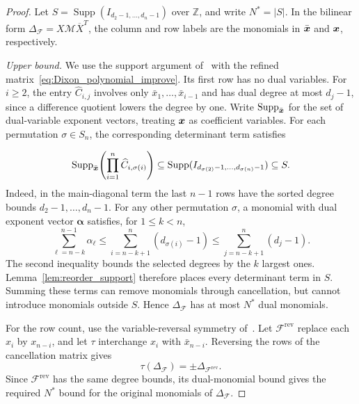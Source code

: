 \begin{proof}
Let $S=\operatorname{Supp}(I_{d_2-1,\ldots,d_n-1})$ over $\mathbb Z$, and write $N^*=|S|$. In the bilinear form $\Delta_{\mathcal F}=X\mathcal M\overline X^T$, the column and row labels are the monomials in $\bar{{\boldsymbol{x}}}$ and ${\boldsymbol{x}}$, respectively.

\emph{Upper bound.}
We use the support argument of~\cite[Lemma~3.3 and Theorem~3.4]{DBLP:conf/stoc/KapurS96} with the refined matrix~\eqref{eq:Dixon_polynomial_improve}. Its first row has no dual variables. For $i\ge2$, the entry $\widehat C_{i,j}$ involves only $\bar x_1,\ldots,\bar x_{i-1}$ and has dual degree at most $d_j-1$, since a difference quotient lowers the degree by one. Write $\operatorname{Supp}_{\bar{{\boldsymbol{x}}}}$ for the set of dual-variable exponent vectors, treating ${\boldsymbol{x}}$ as coefficient variables. For each permutation $\sigma\in S_n$, the corresponding determinant term satisfies

\[
\operatorname{Supp}_{\bar{{\boldsymbol{x}}}}\!\left(\prod_{i=1}^n\widehat C_{i,\sigma(i)}\right)
\subseteq\operatorname{Supp}(I_{d_{\sigma(2)}-1,\ldots,d_{\sigma(n)}-1})
\subseteq S.
\]
Indeed, in the main-diagonal term the last $n-1$ rows have the sorted degree bounds $d_2-1,\ldots,d_n-1$. For any other permutation $\sigma$, a monomial with dual exponent vector $\boldsymbol\alpha$ satisfies, for $1\le k<n$,
\[
\sum_{\ell=n-k}^{n-1}\alpha_\ell
\le \sum_{i=n-k+1}^{n}(d_{\sigma(i)}-1)
\le \sum_{j=n-k+1}^{n}(d_j-1).
\]
The second inequality bounds the selected degrees by the $k$ largest ones. Lemma~\ref{lem:reorder_support} therefore places every determinant term in $S$. Summing these terms can remove monomials through cancellation, but cannot introduce monomials outside $S$. Hence $\Delta_{\mathcal F}$ has at most $N^*$ dual monomials.

For the row count, use the variable-reversal symmetry of~\cite[proof of Proposition~5.1]{ChtcherbaKapur2004}. Let $\mathcal F^{\mathrm{rev}}$ replace each $x_i$ by $x_{n-i}$, and let $\tau$ interchange $x_i$ with $\bar x_{n-i}$. Reversing the rows of the cancellation matrix gives
\begin{equation}\label{eq:tau_symmetry}
\tau(\Delta_{\mathcal F})=\pm\Delta_{\mathcal F^{\mathrm{rev}}}.
\end{equation}
Since $\mathcal F^{\mathrm{rev}}$ has the same degree bounds, its dual-monomial bound gives the required $N^*$ bound for the original monomials of $\Delta_{\mathcal F}$.


\end{proof}
